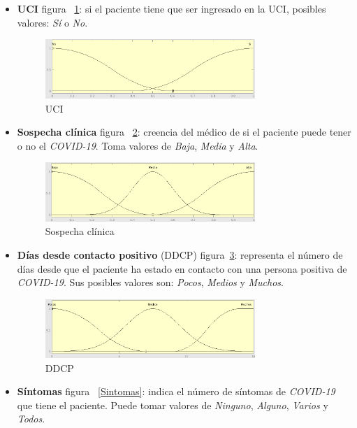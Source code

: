 \documentclass[12pt,a4paper, xcolor=table]{article}
\begin{document}
\begin{itemize}
  \item \textbf{UCI} figura ~\ref{UCI}: si el paciente tiene que ser ingresado en la UCI, posibles valores: \textit{Sí} o \textit{No}.

  \begin{figure}[!h]
      \centering
      \includegraphics[width=300px]{img/UCI.png}
      \caption{UCI}
      \label{UCI}
  \end{figure}

  \item \textbf{Sospecha clínica} figura ~\ref{SC}: creencia del médico de si el paciente puede tener o no el \textit{COVID-19}. Toma valores de \textit{Baja}, \textit{Media} y \textit{Alta}.

  \begin{figure}[!h]
      \centering
      \includegraphics[width=300px]{img/sospecha_clinica.png}
      \caption{Sospecha clínica}
      \label{SC}
  \end{figure}

  \item \textbf{Días desde contacto positivo} (DDCP) figura~\ref{DDCP}: representa el número de días desde que el paciente ha estado en contacto con una persona positiva de \textit{COVID-19}. Sus posibles valores son: \textit{Pocos}, \textit{Medios} y \textit{Muchos}.

  \begin{figure}[!h]
      \centering
      \includegraphics[width=300px]{img/dias_desde_cntcto_positivo.png}
      \caption{DDCP}
      \label{DDCP}
  \end{figure}

  \item \textbf{Síntomas} figura ~\ref{Sintomas}: indica el número de síntomas de \textit{COVID-19} que tiene el paciente. Puede tomar valores de \textit{Ninguno}, \textit{Alguno}, \textit{Varios} y \textit{Todos}.


\end{itemize}
\end{document}
